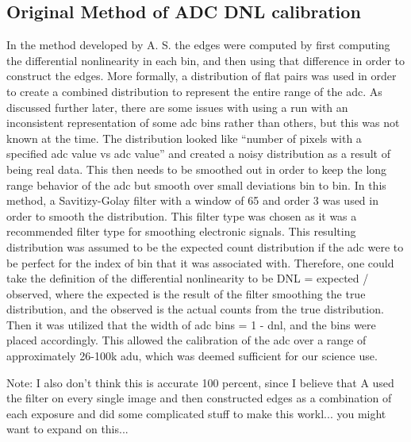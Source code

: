 \documentclass[11pt, letterpaper]{article}
\begin{document}
\subsection{Original Method of ADC DNL calibration}
In the method developed by A. S. the edges were computed by first computing the differential nonlinearity in each bin, and then using that difference in order to construct the edges. More formally, a distribution of flat pairs was used in order to create a combined distribution to represent the entire range of the adc. As discussed further later, there are some issues with using a run with an inconsistent representation of some adc bins rather than others, but this was not known at the time. The distribution looked like “number of pixels with a specified adc value vs adc value” and created a noisy distribution as a result of being real data. This then needs to be smoothed out in order to keep the long range behavior of the adc but smooth over small deviations bin to bin. In this method, a Savitizy-Golay filter with a window of 65 and order 3 was used in order to smooth the distribution. This filter type was chosen as it was a recommended filter type for smoothing electronic signals. This resulting distribution was assumed to be the expected count distribution if the adc were to be perfect for the index of bin that it was associated with. Therefore, one could take the definition of the differential nonlinearity to be DNL = expected / observed, where the expected is the result of the filter smoothing the true distribution, and the observed is the actual counts from the true distribution. Then it was utilized that the width of adc bins = 1 - dnl, and the bins were placed accordingly. This allowed the calibration of the adc over a range of approximately 26-100k adu, which was deemed sufficient for our science use. 

Note: I also don't think this is accurate 100 percent, since I believe that A used the filter on every single image and then constructed edges as a combination of each exposure and did some complicated stuff to make this workl... you might want to expand on this... 
\end{document}

